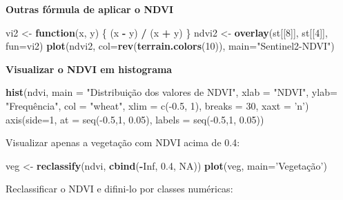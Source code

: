 \documentclass[
]{book}
\newenvironment{Shaded}{\begin{snugshade}}{\end{snugshade}}
\newcommand{\ControlFlowTok}[1]{\textcolor[rgb]{0.13,0.29,0.53}{\textbf{#1}}}
\newcommand{\DataTypeTok}[1]{\textcolor[rgb]{0.13,0.29,0.53}{#1}}
\newcommand{\DecValTok}[1]{\textcolor[rgb]{0.00,0.00,0.81}{#1}}
\newcommand{\FloatTok}[1]{\textcolor[rgb]{0.00,0.00,0.81}{#1}}
\newcommand{\KeywordTok}[1]{\textcolor[rgb]{0.13,0.29,0.53}{\textbf{#1}}}
\newcommand{\NormalTok}[1]{#1}
\newcommand{\OperatorTok}[1]{\textcolor[rgb]{0.81,0.36,0.00}{\textbf{#1}}}
\newcommand{\OtherTok}[1]{\textcolor[rgb]{0.56,0.35,0.01}{#1}}
\newcommand{\StringTok}[1]{\textcolor[rgb]{0.31,0.60,0.02}{#1}}
\begin{document}
\textbf{Outras fórmula de aplicar o NDVI}

\begin{Shaded}
\begin{Highlighting}[]
\NormalTok{vi2 <-}\StringTok{ }\ControlFlowTok{function}\NormalTok{(x, y) \{}
\NormalTok{  (x }\OperatorTok{-}\StringTok{ }\NormalTok{y) }\OperatorTok{/}\StringTok{ }\NormalTok{(x }\OperatorTok{+}\StringTok{ }\NormalTok{y)}
\NormalTok{\}}
\NormalTok{ndvi2 <-}\StringTok{ }\KeywordTok{overlay}\NormalTok{(st[[}\DecValTok{8}\NormalTok{]], st[[}\DecValTok{4}\NormalTok{]], }\DataTypeTok{fun=}\NormalTok{vi2)}
\KeywordTok{plot}\NormalTok{(ndvi2, }\DataTypeTok{col=}\KeywordTok{rev}\NormalTok{(}\KeywordTok{terrain.colors}\NormalTok{(}\DecValTok{10}\NormalTok{)), }\DataTypeTok{main=}\StringTok{"Sentinel2-NDVI"}\NormalTok{)}
\end{Highlighting}
\end{Shaded}

\textbf{Visualizar o NDVI em histograma}

\begin{Shaded}
\begin{Highlighting}[]
\KeywordTok{hist}\NormalTok{(ndvi,}
     \DataTypeTok{main =} \StringTok{"Distribuição dos valores de NDVI"}\NormalTok{,}
     \DataTypeTok{xlab =} \StringTok{"NDVI"}\NormalTok{,}
     \DataTypeTok{ylab=} \StringTok{"Frequência",}
\StringTok{     col = "}\NormalTok{wheat}\StringTok{",}
\StringTok{     xlim = c(-0.5, 1),}
\StringTok{     breaks = 30,}
\StringTok{     xaxt = 'n')}
\StringTok{axis(side=1, at = seq(-0.5,1, 0.05), labels = seq(-0.5,1, 0.05))}
\end{Highlighting}
\end{Shaded}

Visualizar apenas a vegetação com NDVI acima de 0.4:

\begin{Shaded}
\begin{Highlighting}[]
\NormalTok{veg <-}\StringTok{ }\KeywordTok{reclassify}\NormalTok{(ndvi, }\KeywordTok{cbind}\NormalTok{(}\OperatorTok{-}\OtherTok{Inf}\NormalTok{, }\FloatTok{0.4}\NormalTok{, }\OtherTok{NA}\NormalTok{))}
\KeywordTok{plot}\NormalTok{(veg, }\DataTypeTok{main=}\StringTok{'Vegetação'}\NormalTok{)}
\end{Highlighting}
\end{Shaded}

Reclassificar o NDVI e difini-lo por classes numéricas:
\end{document}
